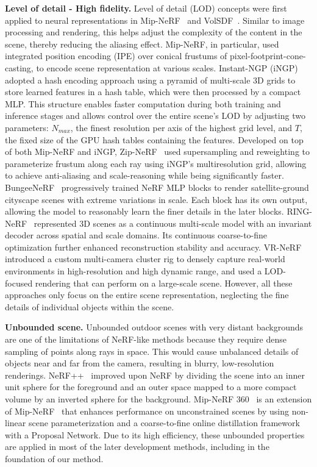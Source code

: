 \textbf{Level of detail - High fidelity.} Level of detail (LOD) concepts were first applied to neural representations in Mip-NeRF~\cite{barron2021mipnerf} and VolSDF~\cite{takikawa2021nglod}. Similar to image processing and rendering, this helps adjust the complexity of the content in the scene, thereby reducing the aliasing effect.
Mip-NeRF, in particular, used integrated position encoding (IPE) over conical frustums of pixel-footprint-cone-casting, to encode scene representation at various scales.
Instant-NGP (iNGP)~\cite{mueller2022instant} adopted a hash encoding approach using a pyramid of multi-scale 3D grids to store learned features in a hash table, which were then processed by a compact MLP. This structure enables faster computation during both training and inference stages and allows control over the entire scene's LOD by adjusting two parameters: $N_{max}$, the finest resolution per axis of the highest grid level, and $T$, the fixed size of the GPU hash tables containing the features.
Developed on top of both Mip-NeRF and iNGP, Zip-NeRF~\cite{barron2023zipnerf} used supersampling and reweighting to parameterize frustum along each ray using iNGP’s multiresolution grid, allowing to achieve anti-aliasing and scale-reasoning while being significantly faster.
BungeeNeRF~\cite{xiangli2022bungeenerf} progressively trained NeRF MLP blocks to render satellite-ground cityscape scenes with extreme variations in scale. Each block has its own output, allowing the model to reasonably learn the finer details in the later blocks.
RING-NeRF~\cite{petit2024ring} represented 3D scenes as a continuous multi-scale model with an invariant decoder across spatial and scale domains. 
Its continuous coarse-to-fine optimization further enhanced reconstruction stability and accuracy.
VR-NeRF~\cite{VRNeRF} introduced a custom multi-camera cluster rig to densely capture real-world environments in high-resolution and high dynamic range, and used a LOD-focused rendering that can perform on a large-scale scene.
However, all these approaches only focus on the entire scene representation, neglecting the fine details of individual objects within the scene.

\textbf{Unbounded scene.} Unbounded outdoor scenes with very distant backgrounds are one of the limitations of NeRF-like methods because they require dense sampling of points along rays in space.
This would cause unbalanced details of objects near and far from the camera, resulting in blurry, low-resolution renderings.
NeRF++~\cite{Zhang2020NeRFAA} improved upon NeRF by dividing the scene into an inner unit sphere for the foreground and an outer space mapped to a more compact volume by an inverted sphere for the background.
Mip-NeRF 360~\cite{barron2022mipnerf360} is an extension of Mip-NeRF~\cite{barron2021mipnerf} that enhances performance on unconstrained scenes by using non-linear scene parameterization and a coarse-to-fine online distillation framework with a Proposal Network.
Due to its high efficiency, these unbounded properties are applied in most of the later development methods, including in the foundation of our method.

